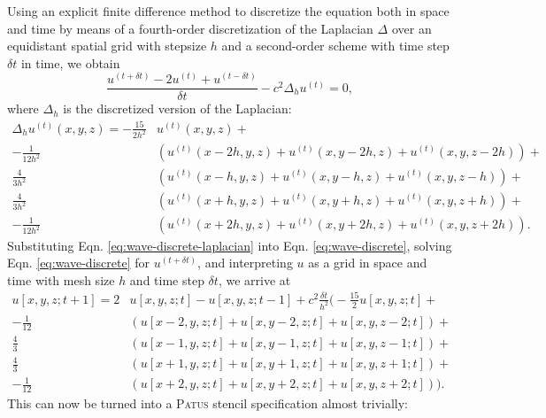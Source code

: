 Using an explicit finite difference method to discretize the equation both in space and time
by means of a fourth-order discretization of the Laplacian $\Delta$ over an equidistant spatial grid with stepsize $h$
and a second-order scheme with time step $\delta t$ in time, we obtain
\begin{equation}
	\label{eq:wave-discrete}
	\frac{u^{(t+\delta t)}-2u^{(t)}+u^{(t-\delta t)}}{\delta t} - c^2 \Delta_h u^{(t)} = 0,
\end{equation}
where $\Delta_h$ is the discretized version of the Laplacian:
\begin{align}
  \label{eq:wave-discrete-laplacian}
  \Delta_h u^{(t)}(x,y,z) = -\tfrac{15}{2h^2} & u^{(t)}(x,y,z) + \\
    -\tfrac{1}{12h^2} & \left(u^{(t)}(x-2h,y,z) + u^{(t)}(x,y-2h,z) + u^{(t)}(x,y,z-2h) \right) + \nonumber \\
     \tfrac{4}{3h^2}  & \left(u^{(t)}(x-h,y,z)  + u^{(t)}(x,y-h,z)  + u^{(t)}(x,y,z-h)  \right) + \nonumber \\                     
     \tfrac{4}{3h^2}  & \left(u^{(t)}(x+h,y,z)  + u^{(t)}(x,y+h,z)  + u^{(t)}(x,y,z+h)  \right) + \nonumber \\
    -\tfrac{1}{12h^2} & \left(u^{(t)}(x+2h,y,z) + u^{(t)}(x,y+2h,z) + u^{(t)}(x,y,z+2h) \right).  \nonumber
\end{align}
Substituting Eqn. \ref{eq:wave-discrete-laplacian} into Eqn. \ref{eq:wave-discrete},
solving Eqn. \ref{eq:wave-discrete} for $u^{(t+\delta t)}$, and interpreting $u$ as a grid in space and time with mesh size $h$
and time step $\delta t$, we arrive at
\begin{align*}
  u[x,y,z;t+1] =  2 & u[x,y,z;t] - u[x,y,z;t-1] + c^2\tfrac{\delta t}{h^2} \Big( -\tfrac{15}{2} u[x,y,z;t] + \\
    -\tfrac{1}{12}& \left(u[x-2,y,z;t] + u[x,y-2,z;t] + u[x,y,z-2;t] \right) + \\
     \tfrac{4}{3}  & \left(u[x-1,y,z;t] + u[x,y-1,z;t] + u[x,y,z-1;t] \right) + \\                     
     \tfrac{4}{3}  & \left(u[x+1,y,z;t] + u[x,y+1,z;t] + u[x,y,z+1;t] \right) + \\
    -\tfrac{1}{12}& \left(u[x+2,y,z;t] + u[x,y+2,z;t] + u[x,y,z+2;t] \right) \!\!\Big).
\end{align*}
This can now be turned into a \textsc{Patus} stencil specification almost trivially:


